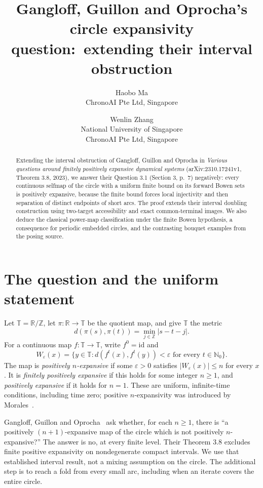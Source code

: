 \documentclass[11pt]{article}
\title{Gangloff, Guillon and Oprocha's circle expansivity question:\ extending their interval obstruction}
\author{Haobo Ma\\\small ChronoAI Pte Ltd, Singapore
\and Wenlin Zhang\\\small National University of Singapore\\\small ChronoAI Pte Ltd, Singapore}
\date{}
\newcommand{\T}{\mathbb T}
\newcommand{\N}{\mathbb N_0}
\begin{document}
\maketitle
\begin{abstract}
Extending the interval obstruction of Gangloff, Guillon and Oprocha in \emph{Various questions around finitely positively expansive dynamical systems} (arXiv:2310.17241v1, Theorem 3.8, 2023), we answer their Question 3.1 (Section 3, p.~7) negatively: every continuous selfmap of the circle with a uniform finite bound on its forward Bowen sets is positively expansive, because the finite bound forces local injectivity and then separation of distinct endpoints of short arcs.
The proof extends their interval doubling construction using two-target accessibility and exact common-terminal images. We also deduce the classical power-map classification under the finite Bowen hypothesis, a consequence for periodic embedded circles, and the contrasting bouquet examples from the posing source.
\end{abstract}

\section{The question and the uniform statement}
Let $\T=\mathbb R/\mathbb Z$, let $\pi:\mathbb R\to\T$ be the quotient map, and give $\T$ the metric
\[
 d(\pi(s),\pi(t))=\min_{j\in\mathbb Z}|s-t-j|.
\]
For a continuous map $f:\T\to\T$, write $f^0=\mathrm{id}$ and
\[
 W_\varepsilon(x)=\{y\in\T: d(f^t(x),f^t(y))<\varepsilon
                    \text{ for every }t\in\N\}.
\]
The map is \emph{positively $n$-expansive} if some $\varepsilon>0$ satisfies $|W_\varepsilon(x)|\le n$ for every $x$. It is \emph{finitely positively expansive} if this holds for some integer $n\ge1$, and \emph{positively expansive} if it holds for $n=1$.
These are uniform, infinite-time conditions, including time zero; positive $n$-expansivity was introduced by Morales~\cite{Morales}.

Gangloff, Guillon and Oprocha~\cite[Question 3.1, Section 3, p.~7]{GGO} ask whether, for each $n\ge1$, there is ``a positively $(n+1)$-expansive map of the circle which is not positively $n$-expansive?'' The answer is no, at every finite level. Their Theorem 3.8 excludes finite positive expansivity on nondegenerate compact intervals. We use that established interval result, not a mixing assumption on the circle. The additional step is to reach a fold from every small arc, including when an iterate covers the entire circle.
\end{document}
